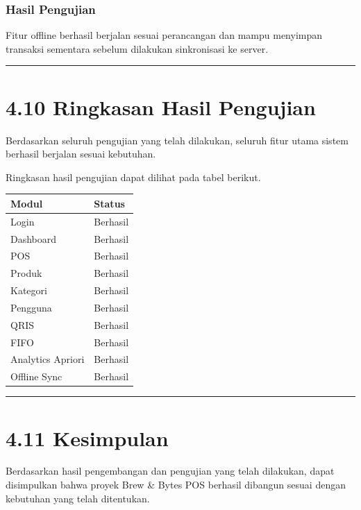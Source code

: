 \subsubsection{Hasil Pengujian}\label{hasil-pengujian-5}

Fitur offline berhasil berjalan sesuai perancangan dan mampu menyimpan transaksi sementara sebelum dilakukan sinkronisasi ke server.

\begin{center}\rule{0.5\linewidth}{0.5pt}\end{center}

\section{4.10 Ringkasan Hasil Pengujian}\label{ringkasan-hasil-pengujian}

Berdasarkan seluruh pengujian yang telah dilakukan, seluruh fitur utama sistem berhasil berjalan sesuai kebutuhan.

Ringkasan hasil pengujian dapat dilihat pada tabel berikut.

{\def\LTcaptype{none} %
\begin{longtable}[]{@{}ll@{}}
\toprule\noalign{}
Modul & Status \\
\midrule\noalign{}
\endhead
\bottomrule\noalign{}
\endlastfoot
Login & Berhasil \\
Dashboard & Berhasil \\
POS & Berhasil \\
Produk & Berhasil \\
Kategori & Berhasil \\
Pengguna & Berhasil \\
QRIS & Berhasil \\
FIFO & Berhasil \\
Analytics Apriori & Berhasil \\
Offline Sync & Berhasil \\
\end{longtable}
}

\begin{center}\rule{0.5\linewidth}{0.5pt}\end{center}

\section{4.11 Kesimpulan}\label{kesimpulan}

Berdasarkan hasil pengembangan dan pengujian yang telah dilakukan, dapat disimpulkan bahwa proyek Brew \& Bytes POS berhasil dibangun sesuai dengan kebutuhan yang telah ditentukan.

